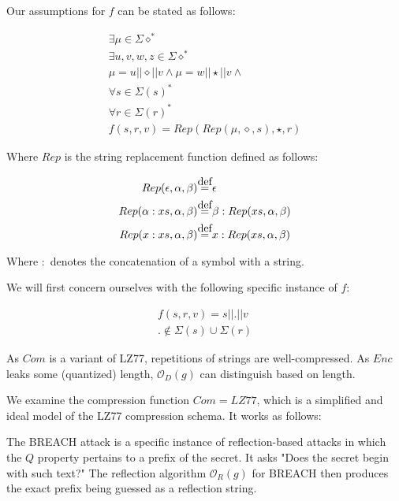 \documentclass{article}
\newcommand\defeq{\stackrel{\mathclap{\normalfont\mbox{def}}}{=}}
\begin{document}
Our assumptions for $f$ can be stated as follows:

\begin{equation*}
\begin{split}
\exists \mu \in \Sigma\diamond^*\\
\exists u, v, w, z \in \Sigma\diamond^*\\
\mu = u || \diamond || v \land
\mu = w || \star || v \land\\
\forall s \in \Sigma(s)^*\\
\forall r \in \Sigma(r)^*\\
f(s, r, v) = Rep(Rep(\mu, \diamond, s), \star, r)
\end{split}
\end{equation*}

Where $Rep$ is the string replacement function defined as follows:

\begin{align*}
Rep(\epsilon, \alpha, \beta) &\defeq \epsilon\\
Rep(\alpha:xs, \alpha, \beta) &\defeq \beta:Rep(xs, \alpha, \beta)\\
Rep(x:xs, \alpha, \beta) &\defeq x:Rep(xs, \alpha, \beta)
\end{align*}

Where $:$ denotes the concatenation of a symbol with a string.

We will first concern ourselves with the following specific instance of $f$:

\begin{equation*}
\begin{split}
f(s, r, v) = s || . || v\\
. \not\in \Sigma(s) \cup \Sigma(r)
\end{split}
\end{equation*}

As $Com$ is a variant of LZ77, repetitions of strings are well-compressed. As
$Enc$ leaks some (quantized) length, $\mathcal{O}_D(g)$ can distinguish based
on length.

We examine the compression function $Com = LZ77$, which is a simplified and
ideal model of the LZ77 compression schema. It works as follows: 

The BREACH attack is a specific instance of reflection-based attacks in which
the $Q$ property pertains to a prefix of the secret. It asks "Does the secret
begin with such text?" The reflection algorithm $\mathcal{O}_R(g)$ for BREACH
then produces the exact prefix being guessed as a reflection string.
\end{document}
